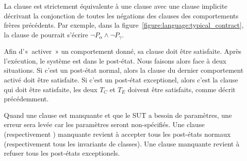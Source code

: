 La clause \adefault est strictement équivalente à une clause \abehavior avec une
clause \arequires implicite décrivant la conjonction de toutes les négations des
clauses \arequires des comportements frères précédents.  Par exemple, dans la
figure~\ref{figure:language:typical_contract}, la clause \arequires de \adefault
pourrait s'écrire $\neg P_\alpha \land \neg P_\gamma$.

Afin d'«~activer~» un comportement donné, sa clause \arequires doit être
satisfaite. Après l'exécution, le système est dans le post-état. Nous faisons
alors face à deux situations. Si c'est un post-état normal, alors la clause
\aensures du dernier comportement activé doit être satisfaite. Si c'est un
post-état exceptionel, alors c'est la clause \athrowable qui doit être
satisfaite, \ie les deux $T_C$ et $T_E$ doivent être satisfaits, comme décrit
précédemment.

Quand une clause \arequires est manquante et que le SUT a besoin de paramètres,
une erreur sera levée car les paramètres seront non-spécifiés. Une clause
\aensures (respectivement \ainvariant) manquante revient à accepter tous les
post-états normaux (respectivement tous les invariants de classes). Une clause
\athrowable manquante revient à refuser tous les post-états exceptionels.

